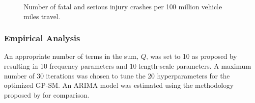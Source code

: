 \documentclass[letterpaper]{article}
\begin{document}
\begin{figure}[t]
     \hfill
     \caption{Number of fatal and serious injury crashes per 100 million vehicle miles travel.}
     \label{fig:data-crashes}
\end{figure}

\subsubsection{Empirical Analysis}

An appropriate number of terms in the sum, $Q$, was set to 10 as proposed by \cite{wilson2015human} resulting in 10 frequency parameters and 10 length-scale parameters. A maximum number of 30 iterations was chosen to tune the 20 hyperparameters for the optimized GP-SM. An ARIMA model was estimated using the methodology proposed by \cite{veeramisti2016business} for comparison.
\end{document}
